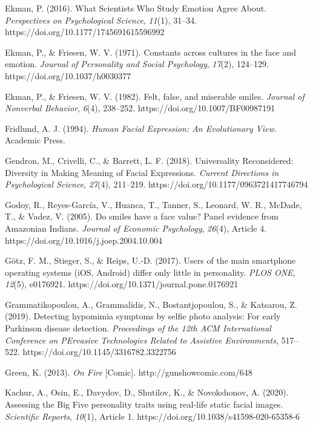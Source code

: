 \documentclass[authordate, empirical]{jote-new-article}
\begin{document}
Ekman, P. (2016). What Scientists Who Study Emotion Agree About. \emph{Perspectives on Psychological Science}, \emph{11}(1), 31--34. https://doi.org/10.1177/1745691615596992



Ekman, P., \& Friesen, W. V. (1971). Constants across cultures in the face and emotion. \emph{Journal of Personality and Social Psychology}, \emph{17}(2), 124--129. https://doi.org/10.1037/h0030377



Ekman, P., \& Friesen, W. V. (1982). Felt, false, and miserable smiles. \emph{Journal of Nonverbal Behavior}, \emph{6}(4), 238--252. https://doi.org/10.1007/BF00987191



Fridlund, A. J. (1994). \emph{Human Facial Expression: An Evolutionary View}. Academic Press.



Gendron, M., Crivelli, C., \& Barrett, L. F. (2018). Universality Reconsidered: Diversity in Making Meaning of Facial Expressions. \emph{Current Directions in Psychological Science}, \emph{27}(4), 211--219. https://doi.org/10.1177/0963721417746794



Godoy, R., Reyes-García, V., Huanca, T., Tanner, S., Leonard, W. R., McDade, T., \& Vadez, V. (2005). Do smiles have a face value? Panel evidence from Amazonian Indians. \emph{Journal of Economic Psychology}, \emph{26}(4), Article 4. https://doi.org/10.1016/j.joep.2004.10.004



Götz, F. M., Stieger, S., \& Reips, U.-D. (2017). Users of the main smartphone operating systems (iOS, Android) differ only little in personality. \emph{PLOS ONE}, \emph{12}(5), e0176921. https://doi.org/10.1371/journal.pone.0176921



Grammatikopoulou, A., Grammalidis, N., Bostantjopoulou, S., \& Katsarou, Z. (2019). Detecting hypomimia symptoms by selfie photo analysis: For early Parkinson disease detection. \emph{Proceedings of the 12th ACM International Conference on }\emph{PErvasive}\emph{ Technologies Related to Assistive Environments}, 517--522. https://doi.org/10.1145/3316782.3322756



Green, K. (2013). \emph{On Fire} [Comic]. http://gunshowcomic.com/648



Kachur, A., Osin, E., Davydov, D., Shutilov, K., \& Novokshonov, A. (2020). Assessing the Big Five personality traits using real-life static facial images. \emph{Scientific Reports}, \emph{10}(1), Article 1. https://doi.org/10.1038/s41598-020-65358-6
\end{document}
